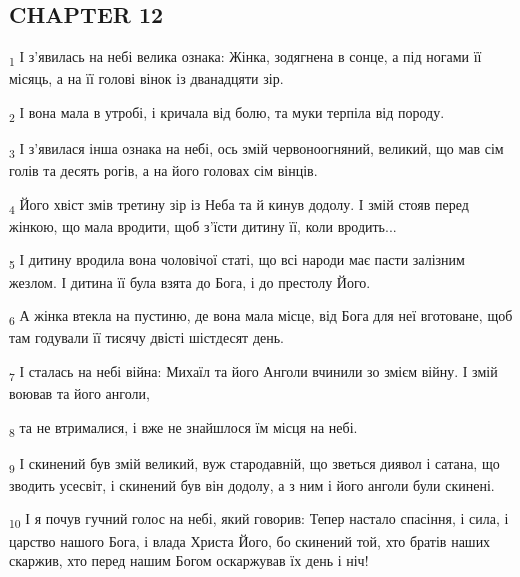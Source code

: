 \subsection{CHAPTER 12}
\begin{tcolorbox}
\textsubscript{1} І з'явилась на небі велика ознака: Жінка, зодягнена в сонце, а під ногами її місяць, а на її голові вінок із дванадцяти зір.
\end{tcolorbox}
\begin{tcolorbox}
\textsubscript{2} І вона мала в утробі, і кричала від болю, та муки терпіла від породу.
\end{tcolorbox}
\begin{tcolorbox}
\textsubscript{3} І з'явилася інша ознака на небі, ось змій червоноогняний, великий, що мав сім голів та десять рогів, а на його головах сім вінців.
\end{tcolorbox}
\begin{tcolorbox}
\textsubscript{4} Його хвіст змів третину зір із Неба та й кинув додолу. І змій стояв перед жінкою, що мала вродити, щоб з'їсти дитину її, коли вродить...
\end{tcolorbox}
\begin{tcolorbox}
\textsubscript{5} І дитину вродила вона чоловічої статі, що всі народи має пасти залізним жезлом. І дитина її була взята до Бога, і до престолу Його.
\end{tcolorbox}
\begin{tcolorbox}
\textsubscript{6} А жінка втекла на пустиню, де вона мала місце, від Бога для неї вготоване, щоб там годували її тисячу двісті шістдесят день.
\end{tcolorbox}
\begin{tcolorbox}
\textsubscript{7} І сталась на небі війна: Михаїл та його Анголи вчинили зо змієм війну. І змій воював та його анголи,
\end{tcolorbox}
\begin{tcolorbox}
\textsubscript{8} та не втрималися, і вже не знайшлося їм місця на небі.
\end{tcolorbox}
\begin{tcolorbox}
\textsubscript{9} І скинений був змій великий, вуж стародавній, що зветься диявол і сатана, що зводить усесвіт, і скинений був він додолу, а з ним і його анголи були скинені.
\end{tcolorbox}
\begin{tcolorbox}
\textsubscript{10} І я почув гучний голос на небі, який говорив: Тепер настало спасіння, і сила, і царство нашого Бога, і влада Христа Його, бо скинений той, хто братів наших скаржив, хто перед нашим Богом оскаржував їх день і ніч!
\end{tcolorbox}
